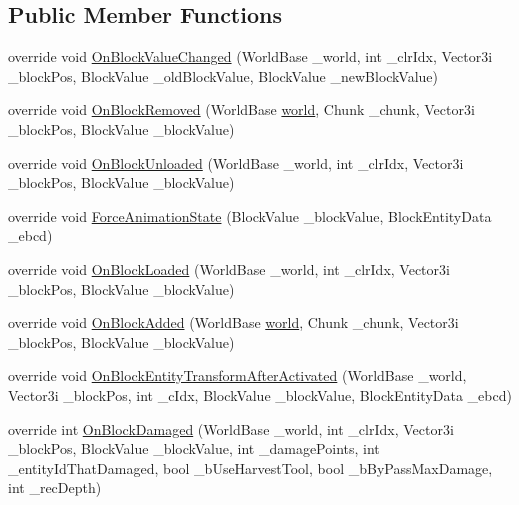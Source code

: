 \subsection*{Public Member Functions}
\begin{DoxyCompactItemize}
\item 
override void \mbox{\hyperlink{class_block_mort_spawner_a9c5df57f2bd03b35d708e4cf12d1423f}{On\+Block\+Value\+Changed}} (World\+Base \+\_\+world, int \+\_\+clr\+Idx, Vector3i \+\_\+block\+Pos, Block\+Value \+\_\+old\+Block\+Value, Block\+Value \+\_\+new\+Block\+Value)
\item 
override void \mbox{\hyperlink{class_block_mort_spawner_a1b17de2a785ae5c703531bf9caf6fa9d}{On\+Block\+Removed}} (World\+Base \mbox{\hyperlink{_sphere_i_i_01_music_01_boxes_2_config_2_localization_8txt_a7ede01351426b1b7f6c1ce5f794e474f}{world}}, Chunk \+\_\+chunk, Vector3i \+\_\+block\+Pos, Block\+Value \+\_\+block\+Value)
\item 
override void \mbox{\hyperlink{class_block_mort_spawner_a13cedf92b3ecbcf25db06376c55ee47c}{On\+Block\+Unloaded}} (World\+Base \+\_\+world, int \+\_\+clr\+Idx, Vector3i \+\_\+block\+Pos, Block\+Value \+\_\+block\+Value)
\item 
override void \mbox{\hyperlink{class_block_mort_spawner_aff9e04e3ad7a4df9101642991c4ee9f1}{Force\+Animation\+State}} (Block\+Value \+\_\+block\+Value, Block\+Entity\+Data \+\_\+ebcd)
\item 
override void \mbox{\hyperlink{class_block_mort_spawner_afa7ad4a7e5450bb9dccec012471cb1e9}{On\+Block\+Loaded}} (World\+Base \+\_\+world, int \+\_\+clr\+Idx, Vector3i \+\_\+block\+Pos, Block\+Value \+\_\+block\+Value)
\item 
override void \mbox{\hyperlink{class_block_mort_spawner_a63c8f9c1511233add803403b62dfe8d9}{On\+Block\+Added}} (World\+Base \mbox{\hyperlink{_sphere_i_i_01_music_01_boxes_2_config_2_localization_8txt_a7ede01351426b1b7f6c1ce5f794e474f}{world}}, Chunk \+\_\+chunk, Vector3i \+\_\+block\+Pos, Block\+Value \+\_\+block\+Value)
\item 
override void \mbox{\hyperlink{class_block_mort_spawner_a7acaf9899167b5e9b8a6232c00ec578d}{On\+Block\+Entity\+Transform\+After\+Activated}} (World\+Base \+\_\+world, Vector3i \+\_\+block\+Pos, int \+\_\+c\+Idx, Block\+Value \+\_\+block\+Value, Block\+Entity\+Data \+\_\+ebcd)
\item 
override int \mbox{\hyperlink{class_block_mort_spawner_abca5a2081742c58e44dbb54331c623d7}{On\+Block\+Damaged}} (World\+Base \+\_\+world, int \+\_\+clr\+Idx, Vector3i \+\_\+block\+Pos, Block\+Value \+\_\+block\+Value, int \+\_\+damage\+Points, int \+\_\+entity\+Id\+That\+Damaged, bool \+\_\+b\+Use\+Harvest\+Tool, bool \+\_\+b\+By\+Pass\+Max\+Damage, int \+\_\+rec\+Depth)

\end{DoxyCompactItemize}
